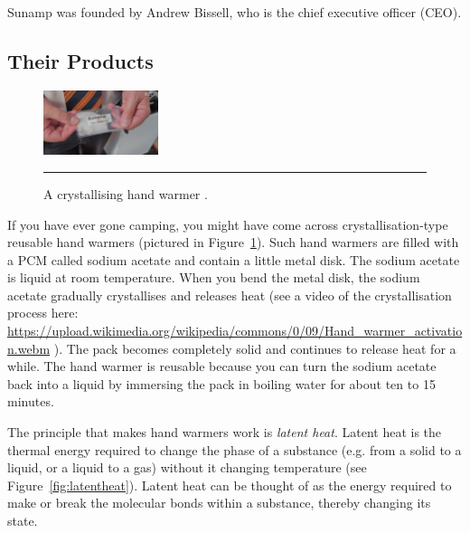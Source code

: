 Sunamp was founded by Andrew Bissell, who is the chief executive officer (CEO).





\subsection*{Their Products}

\begin{figure}
	\includegraphics[width=0.3\textwidth]{figures/sunamp-hand-warmer.png}
	\rule{0.3\textwidth}{0.5pt} %
	\caption{A crystallising hand warmer \citep{FullyCharged}.}
	\label{fig:handwarmer}
\end{figure}

If you have ever gone camping, you might have come across crystallisation-type reusable hand warmers (pictured in Figure~\ref{fig:handwarmer}).
Such hand warmers are filled with a PCM called sodium acetate and contain a little metal disk.
The sodium acetate is liquid at room temperature.
When you bend the metal disk, the sodium acetate gradually crystallises and releases heat 
(see a video of the crystallisation process here: 
\url{https://upload.wikimedia.org/wikipedia/commons/0/09/Hand_warmer_activation.webm} \citep{HandWarmerActivation}).
The pack becomes completely solid and continues to release heat for a while.
The hand warmer is reusable because you can turn the sodium acetate back into a liquid by immersing the pack in boiling water for about ten to 15 minutes.

The principle that makes hand warmers work is \emph{latent heat}.
Latent heat is the thermal energy required to change the phase of a substance (e.g. from a solid to a liquid, or a liquid to a gas) without it changing temperature (see Figure~\ref{fig:latentheat}).
Latent heat can be thought of as the energy required to make or break the molecular bonds within a substance, thereby changing its state.


